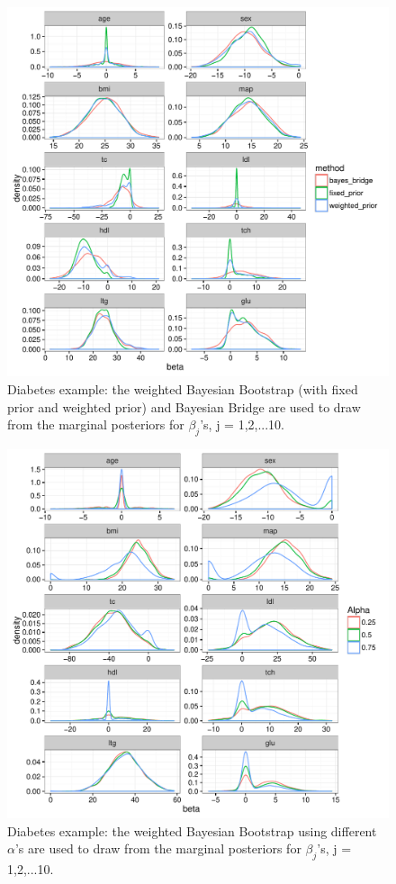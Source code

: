 \documentclass[11pt]{article}%
\begin{document}
\begin{figure}[ht]
\centering 
\includegraphics[scale=0.9]{diabetes.pdf} 
\caption{Diabetes example: the weighted Bayesian Bootstrap (with fixed prior and weighted prior) and Bayesian Bridge are used to draw from the marginal posteriors for $\beta_j$'s, j = 1,2,...10. }
\label{diabetes}
\end{figure}

\begin{figure}[ht]
\centering 
\includegraphics[scale=0.9]{diabetes2.pdf} 
\caption{Diabetes example: the weighted Bayesian Bootstrap using different $\alpha$'s are used to draw from the marginal posteriors for $\beta_j$'s, j = 1,2,...10. }
\label{diabetes}
\end{figure}
\end{document}
